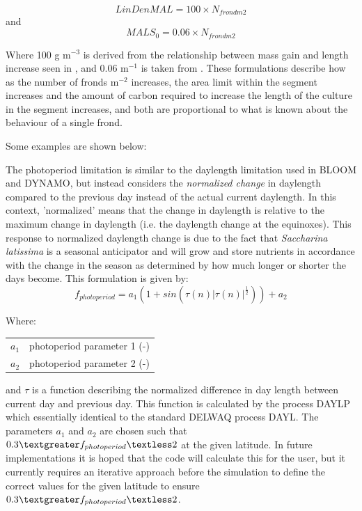 \documentclass{deltares_manual}
\begin{document}
\begin{equation}
LinDenMAL = 100 \times N_{frondm2}
\end{equation}
and
\begin{equation}
MALS_0 = 0.06 \times N_{frondm2}
\end{equation}

Where 100 g m$^{-3}$ is derived from the relationship between mass gain and length increase seen in \cite{sjotun1993}, and 0.06 m$^{-1}$ is taken from \cite{broch2012}. These formulations describe how as the number of fronds m$^{-2}$ increases, the area limit within the segment increases and the amount of carbon required to increase the length of the culture in the segment increases, and both are proportional to what is known about the behaviour of a single frond.

Some examples are shown below:


The photoperiod limitation is similar to the daylength limitation used in BLOOM and DYNAMO, but instead considers the \textit{normalized change} in daylength compared to the previous day instead of the actual current daylength. In this context, 'normalized' means that the change in daylength is relative to the maximum change in daylength (i.e. the daylength change at the equinoxes). This response to normalized daylength change is due to the fact that \textit{Saccharina latissima} is a seasonal anticipator and will grow and store nutrients in accordance with the change in the season as determined by how much longer or shorter the days become. This formulation is given by: 
\begin{equation}
f_{photoperiod} = a_1 (1+sin(\tau (n) | \tau (n)| ^{\frac{1}{2}})) + a_2
\end{equation}

Where:\\

\begin{tabular}{ll}
	$a_1$    & photoperiod parameter 1 (-)\\
	$a_2$    & photoperiod parameter 2 (-)\\
\end{tabular}

and $\tau$ is a function describing the normalized difference in day length between current day and previous day. This function is calculated by the process DAYLP which essentially identical to the standard DELWAQ process DAYL. The parameters $a_1$ and $a_2$ are chosen such that $0.3 \textgreater f_{photoperiod} \textless 2$ at the given latitude. In future implementations it is hoped that the code will calculate this for the user, but it currently requires an iterative approach before the simulation to define the correct values for the given latitude to  ensure $0.3 \textgreater f_{photoperiod} \textless 2$.
\end{document}
